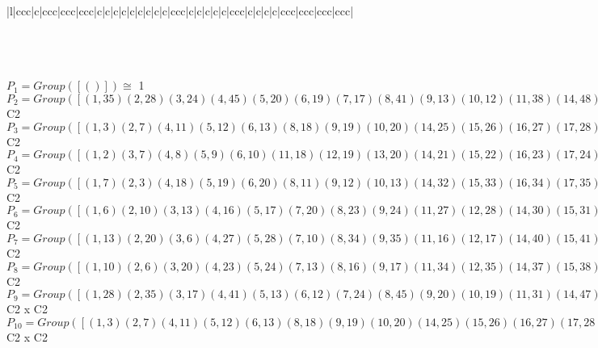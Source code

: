 \documentclass[varwidth=\maxdimen,border=10]{standalone}
\begin{document}
\begin{tabular}
\begin{array}{|l|ccc|c|ccc|ccc|ccc|c|c|c|c|c|c|c|c|c|ccc|c|c|c|c|c|ccc|c|c|c|c|ccc|ccc|ccc|ccc|}
\end{array}\)\\
\ \\
\ \\
$P_{1} = Group( [ () ] )\cong$ 1\ \\
$P_{2} = Group( [ ( 1,35)( 2,28)( 3,24)( 4,45)( 5,20)( 6,19)( 7,17)( 8,41)( 9,13)(10,12)(11,38)(14,48)(15,34)(16,33)(18,31)(21,47)(22,27)(23,26)(25,46)(29,44)(30,43)(32,42)(36,40)(37,39) ] )\cong$ C2\ \\
$P_{3} = Group( [ ( 1, 3)( 2, 7)( 4,11)( 5,12)( 6,13)( 8,18)( 9,19)(10,20)(14,25)(15,26)(16,27)(17,28)(21,32)(22,33)(23,34)(24,35)(29,39)(30,40)(31,41)(36,43)(37,44)(38,45)(42,47)(46,48) ] )\cong$ C2\ \\
$P_{4} = Group( [ ( 1, 2)( 3, 7)( 4, 8)( 5, 9)( 6,10)(11,18)(12,19)(13,20)(14,21)(15,22)(16,23)(17,24)(25,32)(26,33)(27,34)(28,35)(29,36)(30,37)(31,38)(39,43)(40,44)(41,45)(42,46)(47,48) ] )\cong$ C2\ \\
$P_{5} = Group( [ ( 1, 7)( 2, 3)( 4,18)( 5,19)( 6,20)( 8,11)( 9,12)(10,13)(14,32)(15,33)(16,34)(17,35)(21,25)(22,26)(23,27)(24,28)(29,43)(30,44)(31,45)(36,39)(37,40)(38,41)(42,48)(46,47) ] )\cong$ C2\ \\
$P_{6} = Group( [ ( 1, 6)( 2,10)( 3,13)( 4,16)( 5,17)( 7,20)( 8,23)( 9,24)(11,27)(12,28)(14,30)(15,31)(18,34)(19,35)(21,37)(22,38)(25,40)(26,41)(29,42)(32,44)(33,45)(36,46)(39,47)(43,48) ] )\cong$ C2\ \\
$P_{7} = Group( [ ( 1,13)( 2,20)( 3, 6)( 4,27)( 5,28)( 7,10)( 8,34)( 9,35)(11,16)(12,17)(14,40)(15,41)(18,23)(19,24)(21,44)(22,45)(25,30)(26,31)(29,47)(32,37)(33,38)(36,48)(39,42)(43,46) ] )\cong$ C2\ \\
$P_{8} = Group( [ ( 1,10)( 2, 6)( 3,20)( 4,23)( 5,24)( 7,13)( 8,16)( 9,17)(11,34)(12,35)(14,37)(15,38)(18,27)(19,28)(21,30)(22,31)(25,44)(26,45)(29,46)(32,40)(33,41)(36,42)(39,48)(43,47) ] )\cong$ C2\ \\
$P_{9} = Group( [ ( 1,28)( 2,35)( 3,17)( 4,41)( 5,13)( 6,12)( 7,24)( 8,45)( 9,20)(10,19)(11,31)(14,47)(15,27)(16,26)(18,38)(21,48)(22,34)(23,33)(25,42)(29,40)(30,39)(32,46)(36,44)(37,43), ( 1,24)( 2,17)( 3,35)( 4,38)( 5,10)( 6, 9)( 7,28)( 8,31)(11,45)(12,20)(13,19)(14,46)(15,23)(16,22)(18,41)(21,42)(25,48)(26,34)(27,33)(29,37)(30,36)(32,47)(39,44)(40,43) ] )\cong$ C2 x C2\ \\
$P_{10} = Group( [ ( 1, 3)( 2, 7)( 4,11)( 5,12)( 6,13)( 8,18)( 9,19)(10,20)(14,25)(15,26)(16,27)(17,28)(21,32)(22,33)(23,34)(24,35)(29,39)(30,40)(31,41)(36,43)(37,44)(38,45)(42,47)(46,48), ( 1,17)( 2,24)( 3,28)( 4,31)( 5, 6)( 7,35)( 8,38)( 9,10)(11,41)(12,13)(14,42)(15,16)(18,45)(19,20)(21,46)(22,23)(25,47)(26,27)(29,30)(32,48)(33,34)(36,37)(39,40)(43,44) ] )\cong$ C2 x C2\ \\

\end{tabular}
\end{document}
